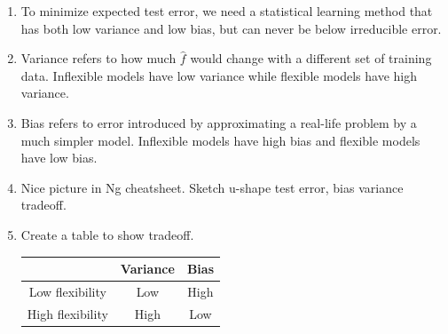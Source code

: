 \documentclass{article}
\begin{document}
\begin{enumerate}
\begin{enumerate}
\[
\mathbb{E}\left[(Y_0 - \hat{f}(x_0))^2\right]
= \mathbb{E}\left[(f(x_0) + \varepsilon - \hat{f}(x_0))^2\right]
\]

\[
= \mathbb{E}\left[(f(x_0) - \hat{f}(x_0) + \varepsilon)^2\right]
\]

\[
= \mathbb{E}\left[(f(x_0) - \hat{f}(x_0))^2 + 2(f(x_0) - \hat{f}(x_0))\varepsilon + \varepsilon^2\right]
\]

\[
= \mathbb{E}\left[(f(x_0) - \hat{f}(x_0))^2\right] + 
2 \mathbb{E}\left[(f(x_0) - \hat{f}(x_0))\varepsilon\right] + 
\mathbb{E}\left[\varepsilon^2\right]
\]

Since \( \varepsilon \) is independent of \( \hat{f}(x_0) \) and has mean zero, the cross term vanishes:

\[
\mathbb{E}\left[(f(x_0) - \hat{f}(x_0))\varepsilon\right] = 0
\quad \text{and} \quad
\mathbb{E}\left[\varepsilon^2\right] = \sigma^2
\]

Now decompose the first term using:

\[
\mathbb{E}\left[(f(x_0) - \hat{f}(x_0))^2\right] =
\left( \mathbb{E}[\hat{f}(x_0)] - f(x_0) \right)^2 +
\operatorname{Var}(\hat{f}(x_0))
\]

Putting it all together:

\[
\mathbb{E}\left[(Y_0 - \hat{f}(x_0))^2\right] =
\underbrace{\operatorname{Var}(\hat{f}(x_0))}_{\text{variance}} +
\underbrace{\left( \operatorname{Bias}(\hat{f}(x_0)) \right)^2}_{\text{squared bias}} +
\underbrace{\sigma^2}_{\text{irreducible error}}
\]

\item To minimize expected test error, we need a statistical learning method that has both low variance and low bias, but can
never be below irreducible error.
\item Variance refers to how much $\hat{f}$ would change with a different set of training data. Inflexible models have low variance while flexible models have high variance.
\item Bias refers to error introduced by approximating a real-life problem by a much simpler model. Inflexible models have high bias and flexible models have low bias.
\item Nice picture in Ng cheatsheet. Sketch u-shape test error, bias variance tradeoff.
\item Create a table to show tradeoff. \\
\begin{tabular}{|c|c|c|}
\hline
 & Variance & Bias \\ 
\hline
Low flexibility & Low & High \\
High flexibility   & High & Low \\
\hline
\end{tabular}


\end{enumerate}
\end{enumerate}
\end{document}
